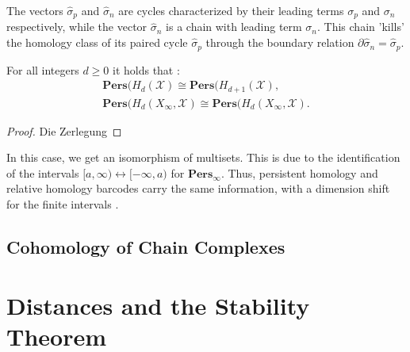 The vectors $\hat{\sigma}_{p}$ and $\hat{\sigma}_{n}$ are cycles characterized by
their leading terms $\sigma_{p}$ and $\sigma_{n}$ respectively, while the vector
$\hat{\sigma}_{n}$ is a chain with leading term $\sigma_{n}$. This chain 'kills'
the homology class of its paired cycle $\hat{\sigma}_{p}$ through the boundary relation
$\partial \hat{\sigma}_{n} = \hat{\sigma}_{p}$.

\begin{theorem}
	For all integers $d \geq 0$ it holds that \cite[§2.4]{de2011dualities}:
	\begin{align*}
		\textbf{Pers}(H_{d}(\mathcal{X}) \cong \textbf{Pers}(H_{d+1}(\mathcal{X}),                       \\
		\textbf{Pers}(H_{d}(X_{\infty}, \mathcal{X}) \cong \textbf{Pers}(H_{d}(X_{\infty}, \mathcal{X}).
	\end{align*}
\end{theorem}

\begin{proof}
	Die Zerlegung
\end{proof}

\begin{remark}
	In this case, we get an isomorphism of multisets. This is due to the identification
	of the intervals $[a,\infty) \leftrightarrow [-\infty, a)$ for $\textbf{Pers}_{\infty}$.
	Thus, persistent homology and relative homology barcodes carry the same information,
	with a dimension shift for the finite intervals \cite[§2.4]{de2011dualities}.
\end{remark}

\subsection{Cohomology of Chain Complexes}

\section{Distances and the Stability Theorem}
